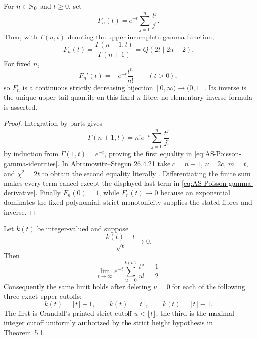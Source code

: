 \begin{proposition}
\label{prop:AS-Poisson-gamma-morphism}
For $n\in\mathbb{N}_{0}$ and $t\geq0$, set
\begin{equation}
\label{eq:AS-Poisson-gamma-morphism}
 F_n(t)=e^{-t}\sum_{j=0}^{n}\frac{t^j}{j!}.
\end{equation}
Then, with $\Gamma(a,t)$ denoting the upper incomplete gamma function,
\begin{equation}
\label{eq:AS-Poisson-gamma-identities}
 F_n(t)=\frac{\Gamma(n+1,t)}{\Gamma(n+1)}
       =Q(2t\mid2n+2).
\end{equation}
For fixed $n$,
\begin{equation}
\label{eq:AS-Poisson-gamma-derivative}
 F_n'(t)=-e^{-t}\frac{t^n}{n!}\qquad(t>0),
\end{equation}
so $F_n$ is a continuous strictly decreasing bijection
$[0,\infty)\to(0,1]$.  Its inverse is the unique upper-tail quantile on this
fixed-$n$ fibre; no elementary inverse formula is asserted.
\end{proposition}

\begin{proof}
Integration by parts gives
\[
 \Gamma(n+1,t)=n!e^{-t}\sum_{j=0}^{n}\frac{t^j}{j!}
\]
by induction from $\Gamma(1,t)=e^{-t}$, proving the first equality in
\eqref{eq:AS-Poisson-gamma-identities}.  In Abramowitz--Stegun 26.4.21 take
$c=n+1$, $\nu=2c$, $m=t$, and $\chi^2=2t$ to obtain the second equality
literally \cite[printed p.~941, Eq.~26.4.21]{AbramowitzStegun1964}.
Differentiating the finite sum makes every term cancel except the displayed
last term in \eqref{eq:AS-Poisson-gamma-derivative}.  Finally $F_n(0)=1$,
while $F_n(t)\to0$ because an exponential dominates the fixed polynomial;
strict monotonicity supplies the stated fibres and inverse.
\end{proof}

\begin{lemma}
\label{lem:Crandall-Poisson-half-mass}
Let $k(t)$ be integer-valued and suppose
\begin{equation}
\label{eq:Crandall-Poisson-moving-cutoff}
 \frac{k(t)-t}{\sqrt t}\longrightarrow0.
\end{equation}
Then
\begin{equation}
\label{eq:Crandall-Poisson-half-mass}
 \lim_{t\to\infty}e^{-t}
 \sum_{u=0}^{k(t)}
 \frac{t^u}{u!}=\frac12.
\end{equation}
Consequently the same limit holds after deleting $u=0$ for each of the
following three exact upper cutoffs:
\begin{equation}
\label{eq:Crandall-Poisson-three-cutoffs}
 k(t)=\lfloor t\rfloor-1,
 \qquad
 k(t)=\lfloor t\rfloor,
 \qquad
 k(t)=\lceil t\rceil-1.
\end{equation}
The first is Crandall's printed strict cutoff
$u<\lfloor t\rfloor$; the third is the maximal integer cutoff uniformly
authorized by the strict height hypothesis in Theorem~5.1.
\end{lemma}

